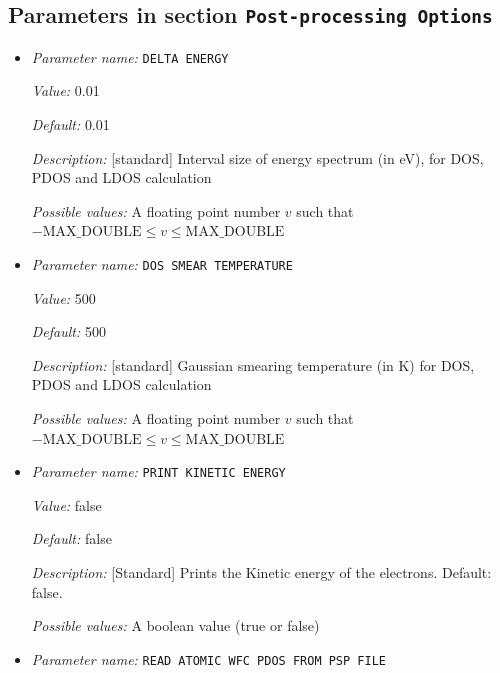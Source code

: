 \subsection{Parameters in section \tt Post-processing Options}
\label{parameters:Post_2dprocessing_20Options}

\begin{itemize}
\item {\it Parameter name:} {\tt DELTA ENERGY}
\label{parameters:Post_2dprocessing Options/DELTA ENERGY}
\label{parameters:Post_2dprocessing_20Options/DELTA_20ENERGY}


{\it Value:} 0.01


{\it Default:} 0.01


{\it Description:} [standard] Interval size of energy spectrum (in eV), for DOS, PDOS and LDOS calculation


{\it Possible values:} A floating point number $v$ such that $-\text{MAX\_DOUBLE} \leq v \leq \text{MAX\_DOUBLE}$
\item {\it Parameter name:} {\tt DOS SMEAR TEMPERATURE}
\label{parameters:Post_2dprocessing Options/DOS SMEAR TEMPERATURE}
\label{parameters:Post_2dprocessing_20Options/DOS_20SMEAR_20TEMPERATURE}


{\it Value:} 500


{\it Default:} 500


{\it Description:} [standard] Gaussian smearing temperature (in K) for DOS, PDOS and LDOS calculation


{\it Possible values:} A floating point number $v$ such that $-\text{MAX\_DOUBLE} \leq v \leq \text{MAX\_DOUBLE}$
\item {\it Parameter name:} {\tt PRINT KINETIC ENERGY}
\label{parameters:Post_2dprocessing Options/PRINT KINETIC ENERGY}
\label{parameters:Post_2dprocessing_20Options/PRINT_20KINETIC_20ENERGY}


{\it Value:} false


{\it Default:} false


{\it Description:} [Standard] Prints the Kinetic energy of the electrons.  Default: false.


{\it Possible values:} A boolean value (true or false)
\item {\it Parameter name:} {\tt READ ATOMIC WFC PDOS FROM PSP FILE}
\label{parameters:Post_2dprocessing Options/READ ATOMIC WFC PDOS FROM PSP FILE}
\label{parameters:Post_2dprocessing_20Options/READ_20ATOMIC_20WFC_20PDOS_20FROM_20PSP_20FILE}



\end{itemize}
